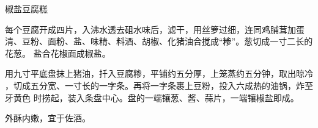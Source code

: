 \begin{recipe}{椒盐豆腐糕}

\ingredients


\preparation

\step 每个豆腐开成四片，入沸水透去砠水味后，滤干，用丝箩过细，连同鸡脯茸加蛋
清、豆粉、面粉、盐、味精、料酒、胡椒、化猪油合搅成“糁”。葱切成一寸二长的花葱。
盐合花椒面成椒盐。

\step 用九寸平底盘抹上猪油，扦入豆腐糁，平铺约五分厚，上笼蒸约五分钟，取出晾冷
，切成五分宽、一寸长的一字条。再将一字条裹上豆粉，投入六成热的油锅，炸至牙黄色
时捞起，装入条盘中心。盘的一端镶葱、酱、蒜片，一端镶椒盐即成。

\features

外酥内嫩，宜于佐酒。

\end{recipe}

